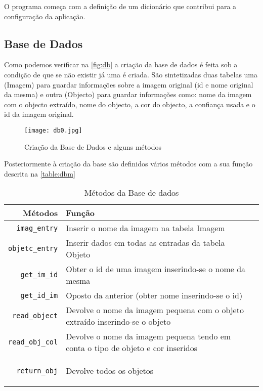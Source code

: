 \documentclass{report}
\begin{document}
O programa começa com a definição de um dicionário que contribui para a configuração da aplicação.


\subsection{Base de Dados}

Como podemos verificar na \autoref{fig:db} a criação da base de dados é feita sob a condição de que se não existir já uma é criada. São sintetizadas duas tabelas uma (Imagem) para guardar informações sobre a imagem original (id e nome original da mesma) e outra (Objecto) para guardar informações como: nome da imagem com o objecto extraído, nome do objecto, a cor do objecto, a confiança usada e o id da imagem original. 

\begin{figure}[h]
\center %
\texttt{[image: db0.jpg]}
\caption{Criação da Base de Dados e alguns métodos}
\label{fig:db}
\end{figure}


Posteriormente à criação da base são definidos vários métodos com a sua função descrita na \autoref{table:dbm}


\begin{table}[h]
\centering
\caption{Métodos da Base de dados}
\begin{tabular}{r|lr}
 
Métodos & Função \\ 
\hline                               
\texttt{imag\_entry}& Inserir o nome da imagem na tabela Imagem \\
\texttt{objetc\_entry} & Inserir dados em todas as entradas da tabela Objeto  \\
\texttt{get\_im\_id} & Obter o id de uma imagem inserindo-se o nome da mesma \\
\texttt{get\_id\_im} & Oposto da anterior (obter nome inserindo-se o id) \\
\texttt{read\_object} & Devolve o nome da imagem pequena com o objeto extraído inserindo-se o objeto  \\
\texttt{read\_obj\_col} &  Devolve o nome da imagem pequena tendo em conta o tipo de objeto e cor inseridos\\
\texttt{return\_obj} & Devolve todos os objetos  
 
 \label{table:dbm}
\end{tabular}
\end{table}
\end{document}

